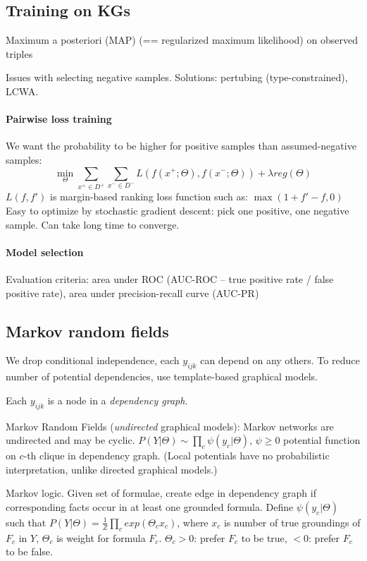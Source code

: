 \subsection{Training on KGs}

Maximum a posteriori (MAP) (== regularized maximum likelihood) on observed
triples

Issues with selecting negative samples. Solutions: pertubing (type-constrained),
LCWA.

\paragraph{Pairwise loss training}
We want the probability to be higher for positive samples than assumed-negative
samples:
$$\min_\Theta \sum_{x^+\in D^+}\sum_{x^-\in
D^-}L(f(x^+;\Theta),f(x^-;\Theta))+\lambda reg(\Theta)$$
$L(f,f')$ is margin-based ranking loss function such as: $\max(1+f'-f,0)$
Easy to optimize by stochastic gradient descent: pick one positive, one negative
sample. Can take long time to converge.

\paragraph{Model selection} Evaluation criteria: area under ROC (AUC-ROC -- true
positive rate / false positive rate), area under precision-recall curve (AUC-PR)

\subsection{Markov random fields}

We drop conditional independence, each $y_{ijk}$ can depend on any others.
To reduce number of potential dependencies, use template-based graphical models.

Each $y_{ijk}$ is a node in a \textit{dependency graph}.

Markov Random Fields (\textit{undirected} graphical models):
Markov networks are undirected and may be cyclic.
$P(Y|\Theta) \sim \prod_c \psi(y_c|\Theta)$, $\psi\geq 0$ potential
function on $c$-th clique in dependency graph. (Local potentials have no
probabilistic interpretation, unlike directed graphical models.)

Markov logic. Given set of formulae, create edge in dependency graph if
corresponding facts occur in at least one grounded formula.
Define $\psi(y_c|\Theta)$ such that $P(Y|\Theta)=\frac{1}{Z}\prod_c
exp(\Theta_c x_c)$, where $x_c$ is number of true groundings of $F_c$ in $Y$,
$\Theta_c$ is weight for formula $F_c$. $\Theta_c>0$: prefer $F_c$ to be true,
$<0$: prefer $F_c$ to be false.


